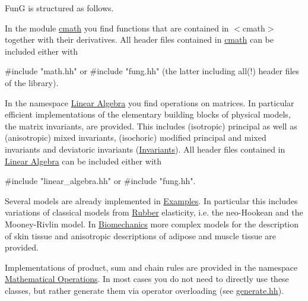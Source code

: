 Fun\-G is structured as follows.


\begin{DoxyItemize}
\item In the module \hyperlink{group__CMathGroup}{cmath} you find functions that are contained in {\ttfamily $<$cmath$>$} together with their derivatives. All header files contained in \hyperlink{group__CMathGroup}{cmath} can be included either with 
\begin{DoxyPre}{\ttfamily #include "math.hh"} or {\ttfamily #include "fung.hh"} (the latter including all(!) header files of the library).\end{DoxyPre}

\item In the namespace \hyperlink{group__LinearAlgebraGroup}{Linear Algebra} you find operations on matrices. In particular efficient implementations of the elementary building blocks of physical models, the matrix invariants, are provided. This includes (isotropic) principal as well as (anisotropic) mixed invariants, (isochoric) modified principal and mixed invariants and deviatoric invariants (\hyperlink{group__InvariantGroup}{Invariants}). All header files contained in \hyperlink{group__LinearAlgebraGroup}{Linear Algebra} can be included either with 
\begin{DoxyPre}{\ttfamily #include "linear\_algebra.hh"} or {\ttfamily #include "fung.hh"}.\end{DoxyPre}

\item Several models are already implemented in \hyperlink{group__Examples}{Examples}. In particular this includes variations of classical models from \hyperlink{group__Rubber}{Rubber} elasticity, i.\-e. the neo-\/\-Hookean and the Mooney-\/\-Rivlin model. In \hyperlink{group__Biomechanics}{Biomechanics} more complex models for the description of skin tissue and anisotropic descriptions of adipose and muscle tissue are provided.
\item Implementations of product, sum and chain rules are provided in the namespace \hyperlink{group__MathematicalOperationsGroup}{Mathematical Operations}. In most cases you do not need to directly use these classes, but rather generate them via operator overloading (see \hyperlink{generate_8hh_source}{generate.\-hh}). 
\end{DoxyItemize}